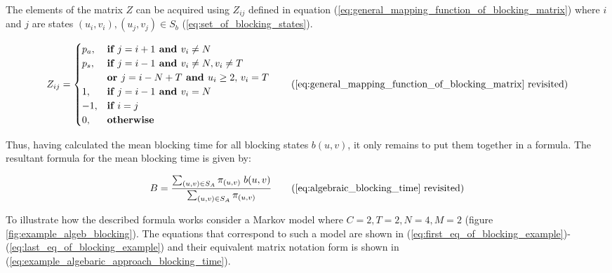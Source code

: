     The elements of the matrix \(Z\) can be acquired using \(Z_{ij}\) defined in 
    equation (\ref{eq:general_mapping_function_of_blocking_matrix}) where \(i\) 
    and \(j\) are states \((u_i, v_i), (u_j, v_j) \in S_b\) 
    (\ref{eq:set_of_blocking_states}).

    \begin{equation}
    Z_{ij} = 
    \begin{cases}
        p_a, & \textbf{if } j = i + 1 \textbf{ and } v_i \neq N \\
        p_s, & \textbf{if } j = i - 1 \textbf{ and } v_i \neq N, v_i \neq T \\
            & \textbf{or } j = i - N + T \textbf{ and } u_i \geq 2,\,v_i = T \\
        1, & \textbf{if } j = i - 1 \textbf{ and } v_i = N \\
        -1, & \textbf{if } i = j \\
        0, & \textbf{otherwise} \\
    \end{cases}
    \tag{\ref{eq:general_mapping_function_of_blocking_matrix} revisited}
\end{equation}


Thus, having calculated the mean blocking time for all blocking states 
\(b(u,v)\), it only remains to put them together in a formula.
The resultant formula for the mean blocking time is given by:

\begin{equation}
    B = \frac{\sum_{(u,v) \in S_A} \pi_{(u,v)} \; b(u,v)}{\sum_{(u,v) \in S_A} 
    \pi_{(u,v)}} \tag{\ref{eq:algebraic_blocking_time} revisited}
\end{equation}

To illustrate how the described formula works consider a Markov model where 
\(C=2, T=2, N=4, M=2\) (figure \ref{fig:example_algeb_blocking}). 
The equations that correspond to such a model are shown in 
(\ref{eq:first_eq_of_blocking_example})-(\ref{eq:last_eq_of_blocking_example}) 
and their equivalent matrix notation form is shown in 
(\ref{eq:example_algebaric_approach_blocking_time}).

